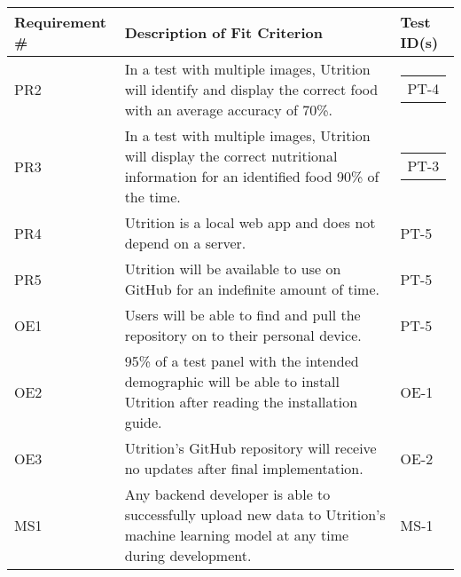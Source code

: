 \documentclass[12pt, titlepage]{article}
\begin{document}
	\begin{table}[H]
		\begin{tabularx}{\textwidth}{|l|X|l|}
			\hline
			{\bf Requirement \#} & {\bf Description of Fit Criterion} & {\bf Test ID(s)}\\
			\hline
			PR2 & In a test with multiple images, Utrition will identify and 
			display the correct food with an average accuracy of 70\%. & 
			\begin{tabular}[c]{@{}l@{}}PT-4 \end{tabular}\\
			\hline
			PR3 & In a test with multiple images, Utrition will display the 
			correct nutritional information for an identified food 90\% of the 
			time. & \begin{tabular}[c]{@{}l@{}}PT-3 \end{tabular}\\
			\hline
			PR4 & Utrition is a local web app and does not depend on a server. & PT-5\\
			\hline
			PR5 & Utrition will be available to use on GitHub for an indefinite amount of time. & PT-5\\
			\hline
			OE1 & Users will be able to find and pull the repository on to their personal device. & PT-5\\
			\hline
			OE2 & 95\% of a test panel with the intended demographic will be able to install Utrition after reading the installation guide. & OE-1\\
			\hline
			OE3 & Utrition’s GitHub repository will receive no updates after final implementation. & OE-2\\
			\hline
			MS1 & Any backend developer is able to successfully upload new data to Utrition’s machine learning model at any time during development.  & MS-1\\
			\hline
		\end{tabularx}
	\end{table}
	
\end{document}
